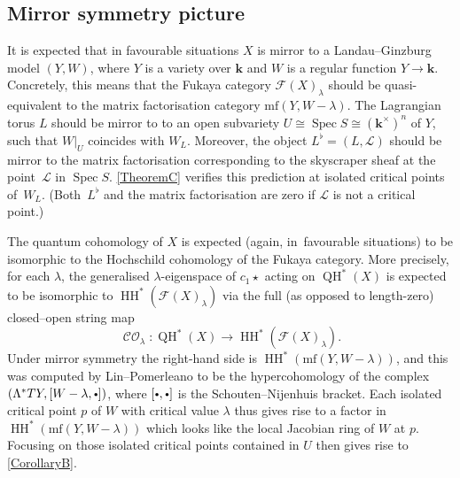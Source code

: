 \documentclass[JEP,XML,SOM,Unicode,NoEqCountersInSection,NoFloatCountersInSection,published]{cedram}
\newcommand{\bbullet}{{\scriptscriptstyle\bullet}}
\newcommand{\cbbullet}{{\raisebox{1pt}{$\bbullet$}}}
\theoremstyle{definition}
\newcommand{\LL}{L^\flat}
\newcommand{\calL}{\mathcal{L}}
\newcommand{\Fuk}{\mathcal{F}}
\newcommand{\kk}{{\boldsymbol{k}}}
\newcommand{\mf}{\mathrm{mf}}
\newcommand{\HH}{\operatorname{HH}}
\newcommand{\Spec}{\operatorname{Spec}}
\newcommand{\CO}{\operatorname{\mathcal{CO}}}
\newcommand{\QH}{\operatorname{QH}}
\newcommand{\qprod}{\mathbin{\star}}
\begin{document}
\subsection{Mirror symmetry picture}
\label{sscMS}

It is expected that in favourable situations $X$ is mirror to a Landau--Ginzburg model $(Y, W)$, where $Y$ is a variety over $\kk$ and $W$ is a regular function $Y \to \kk$. Concretely, this means that the Fukaya category $\Fuk(X)_\lambda$ should be quasi-equivalent to the matrix factorisation category $\mf(Y, W-\lambda)$. The Lagrangian torus $L$ should be mirror to to an open subvariety $U \cong \Spec S \cong (\kk^\times)^n$ of $Y$, such that $W|_U$ coincides with $W_L$. Moreover, the object $\LL = (L, \calL)$ should be mirror to the matrix factorisation corresponding to the skyscraper sheaf at the point~$\calL$ in $\Spec S$. \cref{TheoremC} verifies this prediction at isolated critical points of~$W_L$. (Both~$\LL$ and the matrix factorisation are zero if $\calL$ is not a critical point.)

The quantum cohomology of $X$ is expected (again, in~favourable situations) to be isomorphic to the Hochschild cohomology of the Fukaya category. More precisely, for each $\lambda$, the generalised $\lambda$-eigenspace of $c_1\qprod$ acting on $\QH^*(X)$ is expected to be isomorphic to $\HH^*(\Fuk(X)_\lambda)$ via the full (as opposed to length-zero) closed--open string map
\[
\CO_\lambda : \QH^*(X) \to \HH^*(\Fuk(X)_\lambda).
\]
Under mirror symmetry the right-hand side is $\HH^*(\mf(Y, W-\lambda))$, and this was computed by Lin--Pomerleano \cite[Th.\,3.1]{LinPomerleano} to be the hypercohomology of the complex $(\Lambda^* TY, [W-\lambda, \cbbullet])$, where $[\cbbullet, \cbbullet]$ is the Schouten--Nijenhuis bracket. Each isolated critical point $p$ of $W$ with critical value $\lambda$ thus gives rise to a factor in $\HH^*(\mf(Y, W-\lambda))$ which looks like the local Jacobian ring of $W$ at $p$. Focusing on those isolated critical points contained in $U$ then gives rise to \cref{CorollaryB}.
\end{document}
